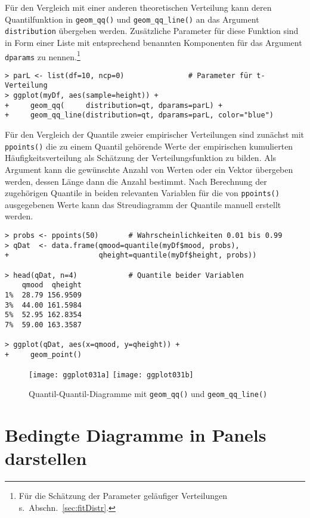 Für den Vergleich mit einer anderen theoretischen Verteilung kann deren Quantilfunktion in \lstinline!geom_qq()! und \lstinline!geom_qq_line()! an das Argument \lstinline!distribution! übergeben werden. Zusätzliche Parameter für diese Funktion sind in Form einer Liste mit entsprechend benannten Komponenten für das Argument \lstinline!dparams! zu nennen.\footnote{Für die Schätzung der Parameter geläufiger Verteilungen s.\ Abschn.\ \ref{sec:fitDistr}.}
\begin{lstlisting}
> parL <- list(df=10, ncp=0)               # Parameter für t-Verteilung
> ggplot(myDf, aes(sample=height)) +
+     geom_qq(     distribution=qt, dparams=parL) +
+     geom_qq_line(distribution=qt, dparams=parL, color="blue")
\end{lstlisting}

Für den Vergleich der Quantile zweier empirischer Verteilungen sind zunächst mit \lstinline!ppoints()! die zu einem Quantil gehörende Werte der empirischen kumulierten Häufigkeitsverteilung als Schätzung der Verteilungsfunktion zu bilden. Als Argument kann die gewünschte Anzahl von Werten oder ein Vektor übergeben werden, dessen Länge dann die Anzahl bestimmt. Nach Berechnung der zugehörigen Quantile in beiden relevanten Variablen für die von \lstinline!ppoints()! ausgegebenen Werte kann das Streudiagramm der Quantile manuell erstellt werden.
\begin{lstlisting}
> probs <- ppoints(50)       # Wahrscheinlichkeiten 0.01 bis 0.99
> qDat  <- data.frame(qmood=quantile(myDf$mood, probs),
+                     qheight=quantile(myDf$height, probs))

> head(qDat, n=4)            # Quantile beider Variablen
    qmood  qheight
1%  28.79 156.9509
3%  44.00 161.5984
5%  52.95 162.8354
7%  59.00 163.3587

> ggplot(qDat, aes(x=qmood, y=qheight)) +
+     geom_point()
\end{lstlisting}

\begin{figure}[ht]
\centering
\texttt{[image: ggplot031a]}
\texttt{[image: ggplot031b]}
\vspace*{-0.5em}
\caption{Quantil-Quantil-Diagramme mit \lstinline!geom_qq()! und \lstinline!geom_qq_line()!}
\label{fig:ggplot031}
\end{figure}

\section{Bedingte Diagramme in Panels darstellen}
\label{sec:ggplotFacet}

